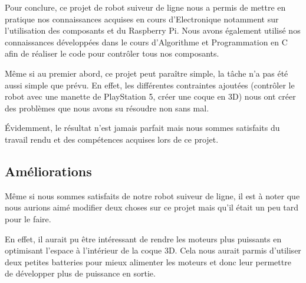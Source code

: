 Pour conclure, ce projet de robot suiveur de ligne nous a permis de mettre en pratique nos connaissances acquises en cours d'Electronique notamment sur l'utilisation des composants et du Raspberry Pi. Nous avons également utilisé nos connaissances développées dans le cours d'Algorithme et Programmation en C afin de réaliser le code pour contrôler tous nos composants.

Même si au premier abord, ce projet peut paraître simple, la tâche n'a pas été aussi simple que prévu. En effet, les différentes contraintes ajoutées (contrôler le robot avec une manette de PlayStation 5, créer une coque en 3D) nous ont créer des problèmes que nous avons su résoudre non sans mal.

Évidemment, le résultat n'est jamais parfait mais nous sommes satisfaits du travail rendu et des compétences acquises lors de ce projet.

\subsection{Améliorations}
Même si nous sommes satisfaits de notre robot suiveur de ligne, il est à noter que nous aurions aimé modifier deux choses sur ce projet mais qu'il était un peu tard pour le faire.

En effet, il aurait pu être intéressant de rendre les moteurs plus puissants en optimisant l'espace à l'intérieur de la coque 3D. Cela nous aurait parmis d'utiliser deux petites batteries pour mieux alimenter les moteurs et donc leur permettre de développer plus de puissance en sortie.

\newpage